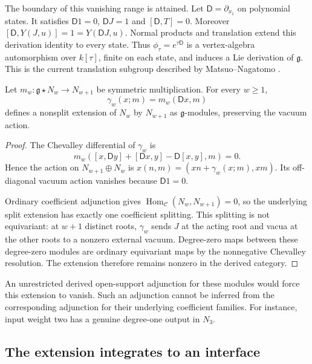 The boundary of this vanishing range is attained. Let
$\mathsf D=\partial_{x_1}$ on polynomial states. It satisfies
$\mathsf D1=0$, $\mathsf DJ=1$ and $[\mathsf D,T]=0$.
Moreover $[\mathsf D,Y(J,u)]=1=Y(\mathsf DJ,u)$.
Normal products and translation extend this derivation identity
to every state. Thus $\phi_\tau=e^{\tau\mathsf D}$ is a
vertex-algebra automorphism over $k[\tau]$, finite on each state,
and induces a Lie derivation of $\mathfrak g$. This is the current
translation subgroup described by Matsuo--Nagatomo
\cite[\S3.3, Theorem 3.6]{MatsuoNagatomo1997}.

\begin{proposition}\label{prop:vol2-upward-current}
Let $m_w:\mathfrak g\star N_w\to N_{w+1}$ be symmetric
multiplication. For every $w\geq1$,
\[
 \gamma_w(x;m)=m_w(\mathsf Dx,m)
\]
defines a nonsplit extension of $N_w$ by $N_{w+1}$ as
$\mathfrak g$-modules, preserving the vacuum action.
\end{proposition}
\begin{proof}
The Chevalley differential of $\gamma_w$ is
\[
 m_w([x,\mathsf Dy]+[\mathsf Dx,y]-\mathsf D[x,y],m)=0.
\]
Hence the action on $N_{w+1}\oplus N_w$ is
$x(n,m)=(xn+\gamma_w(x;m),xm)$. Its off-diagonal vacuum action
vanishes because $\mathsf D1=0$.

Ordinary coefficient adjunction gives
$\operatorname{Hom}_{\mathcal C}(N_w,N_{w+1})=0$, so the underlying
split extension has exactly one coefficient splitting. This
splitting is not equivariant: at $w+1$ distinct roots,
$\gamma_w$ sends $J$ at the acting root and vacua at the other
roots to a nonzero external vacuum. Degree-zero maps between
these degree-zero modules are ordinary equivariant maps by the
nonnegative Chevalley resolution. The extension therefore remains
nonzero in the derived category.
\end{proof}

An unrestricted derived open-support adjunction for these modules
would force this extension to vanish. Such an adjunction cannot be
inferred from the corresponding adjunction for their underlying
coefficient families. For instance, input weight two has a genuine
degree-one output in $N_3$.

\subsection{The extension integrates to an interface}

